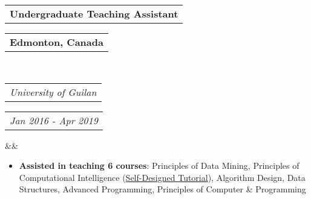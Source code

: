 \documentclass[11pt,a4paper,roman,colorlinks,linkcolor=blue,filecolor=magenta,urlcolor=cyan]{moderncv}        %
\makeatletter
\newcommand*{\customcventry}[7][.25em]{
  \begin{tabular}{@{}l} 
    {\bfseries #4}
  \end{tabular}
  \hfill%
  \begin{tabular}{l@{}}
     {\bfseries #5}
  \end{tabular} \\
  \begin{tabular}{@{}l} 
    {\itshape #3}
  \end{tabular}
  \hfill%
  \begin{tabular}{l@{}}
     {\itshape #2}
  \end{tabular}
  \ifx&#7&%
  \else{\\%
    \begin{minipage}{\maincolumnwidth}%
      \small#7%
    \end{minipage}}\fi%
  \par\addvspace{#1}}
\makeatother
\begin{document}
\vspace{2mm}

\customcventry{Jan 2016 - Apr 2019}{University of Guilan}{Undergraduate Teaching Assistant}{Edmonton, Canada}{}{}
\begin{itemize}
    \item \textbf{Assisted in teaching 6 courses}: Principles of Data Mining, Principles of Computational Intelligence (\href{https://github.com/Computational-Intelligence-Fall18/Computational-Intelligence-Tutorials}{Self-Designed Tutorial}), Algorithm Design, Data Structures, Advanced Programming, Principles of Computer \& Programming
\end{itemize}








\vspace{-2mm}
\end{document}
